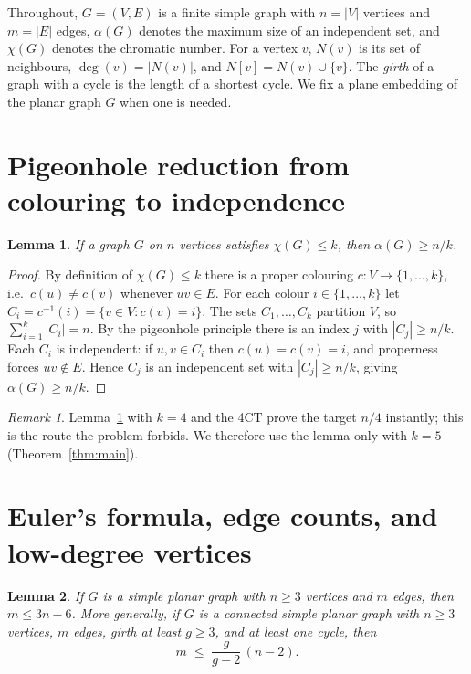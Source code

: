 \documentclass{amsart}
\newtheorem{lemma}{Lemma}
\theoremstyle{remark}
\newtheorem*{remark}{Remark}
\begin{document}
\bigskip

Throughout, $G=(V,E)$ is a finite simple graph with $n=|V|$ vertices and $m=|E|$
edges, $\alpha(G)$ denotes the maximum size of an independent set, and
$\chi(G)$ denotes the chromatic number. For a vertex $v$, $N(v)$ is its set of
neighbours, $\deg(v)=|N(v)|$, and $N[v]=N(v)\cup\{v\}$. The \emph{girth} of a
graph with a cycle is the length of a shortest cycle. We fix a plane embedding of
the planar graph $G$ when one is needed.

\section{Pigeonhole reduction from colouring to independence}

\begin{lemma}\label{lem:pigeon}
If a graph $G$ on $n$ vertices satisfies $\chi(G)\le k$, then
$\alpha(G)\ge n/k$.
\end{lemma}

\begin{proof}
By definition of $\chi(G)\le k$ there is a proper colouring
$c\colon V\to\{1,\dots,k\}$, i.e.\ $c(u)\ne c(v)$ whenever $uv\in E$. For each
colour $i\in\{1,\dots,k\}$ let $C_i=c^{-1}(i)=\{v\in V: c(v)=i\}$. The sets
$C_1,\dots,C_k$ partition $V$, so $\sum_{i=1}^{k}|C_i|=n$. By the pigeonhole
principle there is an index $j$ with $|C_j|\ge n/k$. Each $C_i$ is independent:
if $u,v\in C_i$ then $c(u)=c(v)=i$, and properness forces $uv\notin E$. Hence
$C_j$ is an independent set with $|C_j|\ge n/k$, giving $\alpha(G)\ge n/k$.
\end{proof}

\begin{remark}
Lemma~\ref{lem:pigeon} with $k=4$ and the 4CT prove the target $n/4$ instantly;
this is the route the problem forbids. We therefore use the lemma only with
$k=5$ (Theorem~\ref{thm:main}).
\end{remark}

\section{Euler's formula, edge counts, and low-degree vertices}

\begin{lemma}\label{lem:edges}
If $G$ is a simple planar graph with $n\ge 3$ vertices and $m$ edges, then
$m\le 3n-6$. More generally, if $G$ is a connected simple planar graph with
$n\ge3$ vertices, $m$ edges, girth at least $g\ge3$, and at least one cycle,
then
\begin{equation}\label{eq:girth-edges}
   m \;\le\; \frac{g}{g-2}\,(n-2).
\end{equation}
\end{lemma}
\end{document}
